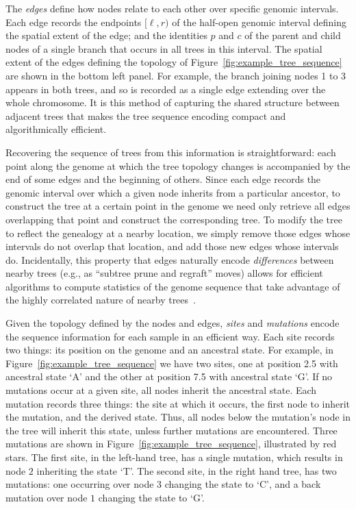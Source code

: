 \documentclass{article}
\begin{document}
The \emph{edges} define how nodes relate to each other over specific genomic intervals.
Each edge records
the endpoints $[\ell, r)$ of the half-open genomic interval defining the
spatial extent of the edge;
and the identities $p$ and $c$ of the parent and child nodes
of a single branch that occurs in all trees in this interval.
The spatial extent of the edges defining the topology of Figure~\ref{fig:example_tree_sequence}
are shown in the bottom left panel.
For example, the branch joining nodes 1 to 3 appears in both trees,
and so is recorded as a single edge extending over the whole chromosome.
It is this method of capturing the shared structure between adjacent trees that makes the
tree sequence encoding compact and algorithmically efficient.

Recovering the sequence of trees from this information is straightforward:
each point along the genome at which the tree topology changes
is accompanied by the end of some {edges} and the beginning of others.
Since each {edge} records the genomic interval
over which a given node inherits from a particular ancestor,
to construct the tree at a certain point in the genome
we need only retrieve all edges overlapping that point
and construct the corresponding tree.
To modify the tree to reflect the genealogy at a nearby location,
we simply remove those edges whose intervals do not overlap that location,
and add those new edges whose intervals do.
Incidentally, this property that edges naturally encode \emph{differences}
between nearby trees (e.g., as ``subtree prune and regraft'' moves)
allows for efficient algorithms to compute statistics of the genome sequence that take advantage
of the highly correlated nature of nearby trees~\citep{kelleher2016efficient}.

Given the topology defined by the nodes and edges, \emph{sites} and \emph{mutations}
encode the sequence information for each sample in an efficient way. Each site
records two things: its position on the genome and an ancestral state.
For example,
in Figure~\ref{fig:example_tree_sequence} we have two sites, one at position
2.5 with ancestral state `A' and the other at position 7.5 with ancestral state `G'.
If no mutations occur at a given site, all nodes inherit the ancestral state.
Each mutation records three things: the site at which it occurs,
the first node to inherit the mutation, and the derived state.
Thus, all nodes below the mutation's node in the tree will inherit this state,
unless further mutations are encountered.
Three mutations are shown in Figure~\ref{fig:example_tree_sequence},
illustrated by red stars.
The first site, in the left-hand tree,
has a single mutation, which results in node $2$ inheriting the state `T'.
The second site, in the right hand tree, has two mutations:
one occurring over node $3$ changing the state to `C',
and a back mutation over node $1$ changing the state to `G'.
\end{document}
